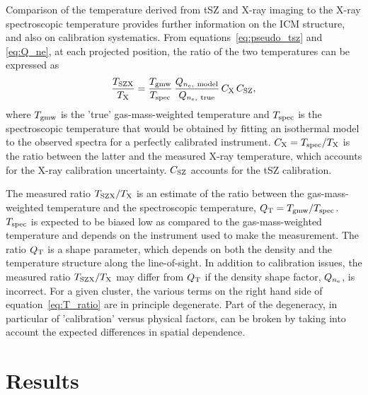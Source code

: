 \documentclass[twocolumn,traditabstract]{aa}
\def\TSZ {T_{\rm SZX}}
\def\TMW {T_{\rm gmw}}
\def \TX {T_{\rm X}}
\begin{document}
Comparison of the temperature derived from tSZ and X-ray imaging to the X-ray spectroscopic temperature provides further information on the ICM structure, and also on calibration systematics. From equations~\ref{eq:pseudo_tsz} and \ref{eq:Q_ne}, at each projected position, the ratio of the two temperatures can be expressed as
\begin{equation}
	\frac{\TSZ }{\TX} = \frac{\TMW}{T_{\rm spec}}\,\frac{Q_{n_{\rm e}, \ {\rm model}}} {Q_{n_{\rm e}, \ {\rm true}}} \, C_{\rm X}\,C_{\rm SZ},
\label{eq:T_ratio}
\end{equation}
where $\TMW$ is the 'true' gas-mass-weighted temperature and $T_{\rm spec}$ is the spectroscopic temperature that would be obtained by fitting an isothermal model to the observed spectra for a perfectly calibrated instrument. $C_{\rm X} = T_{\rm spec}/\TX$ is the ratio between the latter and the measured X-ray temperature, which accounts for the X-ray calibration uncertainty. $C_{\rm SZ}$ accounts for the tSZ calibration.

The measured ratio $\TSZ/\TX$ is an estimate of the ratio between the gas-mass-weighted temperature and the spectroscopic temperature, $Q{_{\rm T}}= \TMW/T_{\rm spec}$. $T_{\rm spec}$ is expected to be biased low as compared to the gas-mass-weighted temperature and depends on the instrument used to make the measurement. The ratio $Q_{\rm T}$ is a shape parameter, which depends on both the density and the temperature structure along the line-of-sight. In addition to calibration issues, the measured ratio $\TSZ/\TX$ may differ from $Q{_{\rm T}}$ if the density shape factor, $Q_{n_{\rm e}}$, is incorrect. For a given cluster, the various terms on the right hand side of equation~\ref{eq:T_ratio} are in principle degenerate. Part of the degeneracy, in particular of 'calibration' versus physical factors, can be broken by taking into account the expected differences in spatial dependence.

\section{Results}\label{sec:results}
\end{document}
